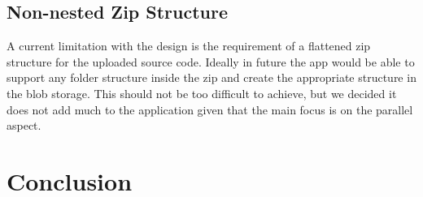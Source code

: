 \documentclass[conference]{IEEEtran}
\begin{document}
\subsection{Non-nested Zip Structure}
A current limitation with the design is the requirement of a flattened zip
structure for the uploaded source code. Ideally in future the app would be able
to support any folder structure inside the zip and create the appropriate
structure in the blob storage. This should not be too difficult to achieve, but
we decided it does not add much to the application given that the main focus is
on the parallel aspect.
\section{Conclusion}

\end{document}
